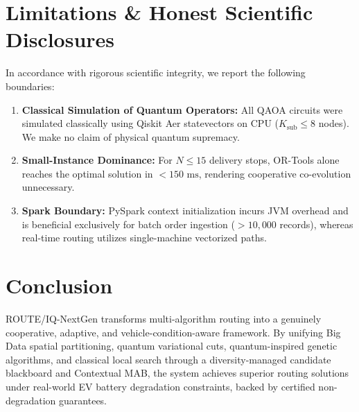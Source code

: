 \documentclass[journal,10pt]{IEEEtran}
\begin{document}
\section{Limitations & Honest Scientific Disclosures}
In accordance with rigorous scientific integrity, we report the following boundaries:
\begin{enumerate}
    \item \textbf{Classical Simulation of Quantum Operators:} All QAOA circuits were simulated classically using Qiskit Aer statevectors on CPU ($K_{\text{sub}} \le 8$ nodes). We make no claim of physical quantum supremacy.
    \item \textbf{Small-Instance Dominance:} For $N \le 15$ delivery stops, OR-Tools alone reaches the optimal solution in $< 150\text{ ms}$, rendering cooperative co-evolution unnecessary.
    \item \textbf{Spark Boundary:} PySpark context initialization incurs JVM overhead and is beneficial exclusively for batch order ingestion ($> 10,000$ records), whereas real-time routing utilizes single-machine vectorized paths.
\end{enumerate}

\section{Conclusion}
ROUTE/IQ-NextGen transforms multi-algorithm routing into a genuinely cooperative, adaptive, and vehicle-condition-aware framework. By unifying Big Data spatial partitioning, quantum variational cuts, quantum-inspired genetic algorithms, and classical local search through a diversity-managed candidate blackboard and Contextual MAB, the system achieves superior routing solutions under real-world EV battery degradation constraints, backed by certified non-degradation guarantees.



\end{document}
